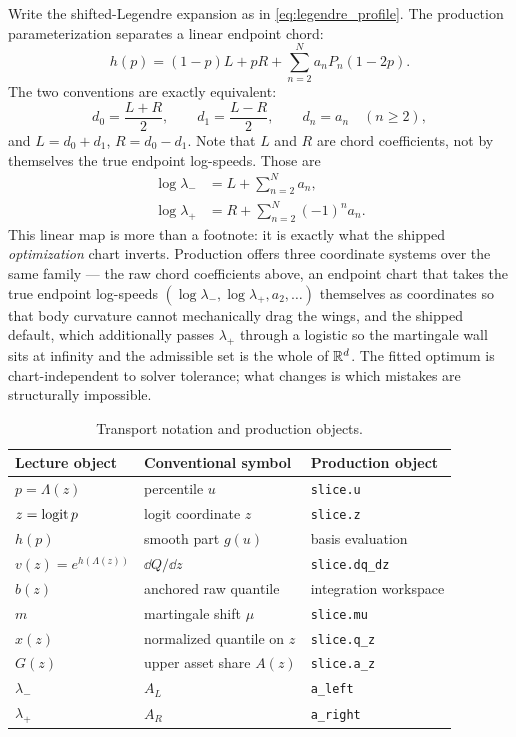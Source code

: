 \documentclass[11pt]{article}
\begin{document}
Write the shifted-Legendre expansion as in \eqref{eq:legendre_profile}.  The
production parameterization separates a linear endpoint chord:
\begin{equation}
h(p)=(1-p)L+pR+\sum_{n=2}^{N}a_nP_n(1-2p).
\label{eq:production_profile}
\end{equation}
The two conventions are exactly equivalent:
\begin{equation}
d_0=\frac{L+R}{2},\qquad
d_1=\frac{L-R}{2},\qquad
d_n=a_n\quad(n\ge2),
\label{eq:chart_forward}
\end{equation}
and $L=d_0+d_1$, $R=d_0-d_1$.  Note that $L$ and $R$ are chord coefficients,
not by themselves the true endpoint log-speeds.  Those are
\begin{align}
\log\lambda_-&=L+\sum_{n=2}^{N}a_n,
\label{eq:production_left_endpoint}\\
\log\lambda_+&=R+\sum_{n=2}^{N}(-1)^na_n.
\label{eq:production_right_endpoint}
\end{align}
This linear map is more than a footnote: it is exactly what the shipped
\emph{optimization} chart inverts.  Production offers three coordinate
systems over the same family --- the raw chord coefficients above, an
endpoint chart that takes the true endpoint log-speeds
$(\log\lambda_-,\log\lambda_+,a_2,\dots)$ themselves as coordinates so
that body curvature cannot mechanically drag the wings, and the shipped
default, which additionally passes $\lambda_+$ through a logistic so the
martingale wall sits at infinity and the admissible set is the whole of
$\mathbb{R}^d$.  The fitted optimum is chart-independent to solver tolerance; what
changes is which mistakes are structurally impossible.

\begin{table}[H]
\centering
\caption{Transport notation and production objects.}
\label{tab:dictionary}
\begin{tabular}{@{}p{}p{}p{}@{}}
\toprule
Lecture object & Conventional symbol & Production object\\
\midrule
$p=\Lambda(z)$ & percentile $u$ & \texttt{slice.u}\\
$z=\operatorname{logit} p$ & logit coordinate $z$ & \texttt{slice.z}\\
$h(p)$ & smooth part $g(u)$ & basis evaluation\\
$v(z)=e^{h(\Lambda(z))}$ & $\dd Q/\dd z$ & \texttt{slice.dq\_dz}\\
$b(z)$ & anchored raw quantile & integration workspace\\
$m$ & martingale shift $\mu$ & \texttt{slice.mu}\\
$x(z)$ & normalized quantile on $z$ & \texttt{slice.q\_z}\\
$G(z)$ & upper asset share $A(z)$ & \texttt{slice.a\_z}\\
$\lambda_-$ & $A_L$ & \texttt{a\_left}\\
$\lambda_+$ & $A_R$ & \texttt{a\_right}\\
\bottomrule
\end{tabular}
\end{table}
\end{document}
